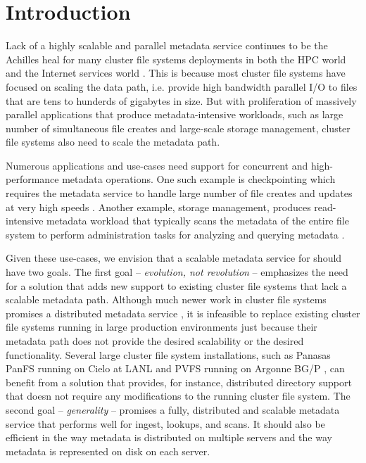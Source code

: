 \section{Introduction}

Lack of a highly scalable and parallel metadata service continues to be the 
Achilles heal for many cluster file systems deployments in both the HPC world 
and the Internet services world \citep{hecfsio:tr06, hpcs-io:2008}.
This is because most cluster file systems have focused on scaling the
data path, i.e. provide high bandwidth parallel I/O to files that are tens to
hunderds of gigabytes in size.
But with proliferation of massively parallel applications that produce 
metadata-intensive workloads, such as large number of simultaneous file creates
and large-scale storage management, cluster file systems also need to scale the
metadata path.

Numerous applications and use-cases need support for concurrent and 
high-performance metadata operations.
One such example is checkpointing which requires the metadata service to
handle large number of file creates and updates at very high speeds 
\cite{PLFS}.
Another example, storage management, produces read-intensive metadata workload
that typically scans the metadata of the entire file system to perform
administration tasks for analyzing and querying metadata \cite{issdm}.

Given these use-cases, we envision that a scalable metadata service for 
should have two goals. 
The first goal -- \textit{evolution, not revolution} -- emphasizes the need for
a solution that adds new support to existing cluster file systems that lack a 
scalable metadata path.
Although much newer work in cluster file systems promises a distributed
metadata service \cite{ceph:weil06, 50mfiles-in-googlefs:fikes10}, it is
infeasible to replace existing cluster file systems running in large production
environments just because their metadata path does not provide the desired
scalability or the desired functionality.
Several large cluster file system installations, such as Panasas PanFS running
on Cielo at LANL \cite{panfs:welch08,cielo} and PVFS running on Argonne BG/P 
\cite{pvfs:www,bgp}, can 
benefit from a solution that provides, for instance, distributed directory support 
that doesn not require any modifications to the running cluster file system.
The second goal -- \textit{generality} -- promises a fully, distributed and
scalable metadata service that performs well for ingest, lookups, and scans. It
should also be efficient in the way metadata is distributed on multiple servers
and the way metadata is represented on disk on each server.

